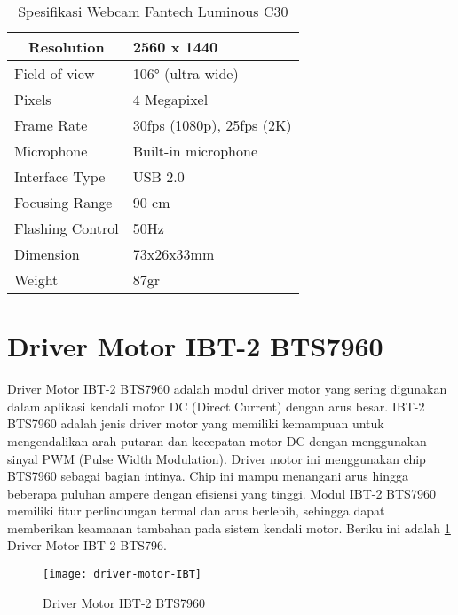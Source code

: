 \begin{table}[H]
	\caption{Spesifikasi Webcam Fantech Luminous C30}
	\label{tab:spesifikasi-webcam}
	\centering
	\begin{tabular}{|l|l|}
		\hline
		\multicolumn{1}{|c|}{Resolution} & 2560 x 1440               \\ \hline
		Field of view                    & 106° (ultra wide)         \\ \hline
		Pixels                           & 4 Megapixel               \\ \hline
		Frame Rate                       & 30fps (1080p), 25fps (2K) \\ \hline
		Microphone                       & Built-in microphone       \\ \hline
		Interface Type                   & USB 2.0                   \\ \hline
		Focusing Range                   & 90 cm                     \\ \hline
		Flashing Control                 & 50Hz                      \\ \hline
		Dimension                        & 73x26x33mm                \\ \hline
		Weight                           & 87gr                      \\ \hline
	\end{tabular}
\end{table}

\section{Driver Motor IBT-2 BTS7960}
Driver Motor IBT-2 BTS7960 adalah modul driver motor yang sering digunakan dalam aplikasi kendali motor DC (Direct Current) dengan arus besar. IBT-2 BTS7960 adalah jenis driver motor yang memiliki kemampuan untuk mengendalikan arah putaran dan kecepatan motor DC dengan menggunakan sinyal PWM (Pulse Width Modulation).
Driver motor ini menggunakan chip BTS7960 sebagai bagian intinya. Chip ini mampu menangani arus hingga beberapa puluhan ampere dengan efisiensi yang tinggi. Modul IBT-2 BTS7960 memiliki fitur perlindungan termal dan arus berlebih, sehingga dapat memberikan keamanan tambahan pada sistem kendali motor. Beriku ini adalah \cref{fig:driver-motor-ibt} Driver Motor IBT-2 BTS796.

\begin{figure}[H]
	\centering
	\texttt{[image: driver-motor-IBT]}
	\caption{Driver Motor IBT-2 BTS7960}
	\label{fig:driver-motor-ibt}
\end{figure}

